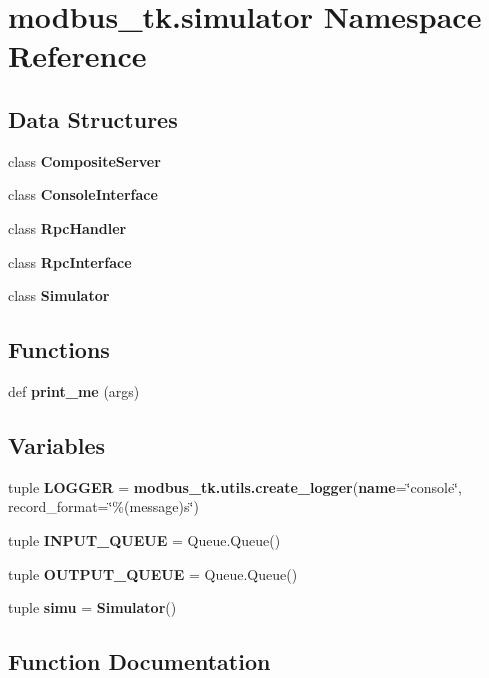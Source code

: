 \section{modbus\+\_\+tk.\+simulator Namespace Reference}
\label{namespacemodbus__tk_1_1simulator}
\subsection*{Data Structures}
\begin{DoxyCompactItemize}
\item 
class {\bf Composite\+Server}
\item 
class {\bf Console\+Interface}
\item 
class {\bf Rpc\+Handler}
\item 
class {\bf Rpc\+Interface}
\item 
class {\bf Simulator}
\end{DoxyCompactItemize}
\subsection*{Functions}
\begin{DoxyCompactItemize}
\item 
def {\bf print\+\_\+me} (args)
\end{DoxyCompactItemize}
\subsection*{Variables}
\begin{DoxyCompactItemize}
\item 
tuple {\bf L\+O\+G\+G\+E\+R} = {\bf modbus\+\_\+tk.\+utils.\+create\+\_\+logger}({\bf name}=\char`\"{}console\char`\"{}, record\+\_\+format=\char`\"{}\%(message)s\char`\"{})
\item 
tuple {\bf I\+N\+P\+U\+T\+\_\+\+Q\+U\+E\+U\+E} = Queue.\+Queue()
\item 
tuple {\bf O\+U\+T\+P\+U\+T\+\_\+\+Q\+U\+E\+U\+E} = Queue.\+Queue()
\item 
tuple {\bf simu} = {\bf Simulator}()
\end{DoxyCompactItemize}


\subsection{Function Documentation}
